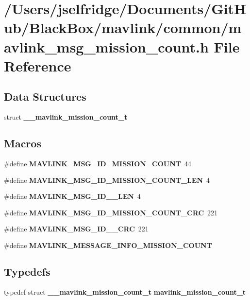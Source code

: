 \section{/\+Users/jselfridge/\+Documents/\+Git\+Hub/\+Black\+Box/mavlink/common/mavlink\+\_\+msg\+\_\+mission\+\_\+count.h File Reference}
\label{mavlink__msg__mission__count_8h}
\subsection*{Data Structures}
\begin{DoxyCompactItemize}
\item 
struct \textbf{ \+\_\+\+\_\+mavlink\+\_\+mission\+\_\+count\+\_\+t}
\end{DoxyCompactItemize}
\subsection*{Macros}
\begin{DoxyCompactItemize}
\item 
\#define \textbf{ M\+A\+V\+L\+I\+N\+K\+\_\+\+M\+S\+G\+\_\+\+I\+D\+\_\+\+M\+I\+S\+S\+I\+O\+N\+\_\+\+C\+O\+U\+NT}~44
\item 
\#define \textbf{ M\+A\+V\+L\+I\+N\+K\+\_\+\+M\+S\+G\+\_\+\+I\+D\+\_\+\+M\+I\+S\+S\+I\+O\+N\+\_\+\+C\+O\+U\+N\+T\+\_\+\+L\+EN}~4
\item 
\#define \textbf{ M\+A\+V\+L\+I\+N\+K\+\_\+\+M\+S\+G\+\_\+\+I\+D\+\_\+\_\+\+L\+EN}~4
\item 
\#define \textbf{ M\+A\+V\+L\+I\+N\+K\+\_\+\+M\+S\+G\+\_\+\+I\+D\+\_\+\+M\+I\+S\+S\+I\+O\+N\+\_\+\+C\+O\+U\+N\+T\+\_\+\+C\+RC}~221
\item 
\#define \textbf{ M\+A\+V\+L\+I\+N\+K\+\_\+\+M\+S\+G\+\_\+\+I\+D\+\_\+\_\+\+C\+RC}~221
\item 
\#define \textbf{ M\+A\+V\+L\+I\+N\+K\+\_\+\+M\+E\+S\+S\+A\+G\+E\+\_\+\+I\+N\+F\+O\+\_\+\+M\+I\+S\+S\+I\+O\+N\+\_\+\+C\+O\+U\+NT}
\end{DoxyCompactItemize}
\subsection*{Typedefs}
\begin{DoxyCompactItemize}
\item 
typedef struct \textbf{ \+\_\+\+\_\+mavlink\+\_\+mission\+\_\+count\+\_\+t} \textbf{ mavlink\+\_\+mission\+\_\+count\+\_\+t}
\end{DoxyCompactItemize}


